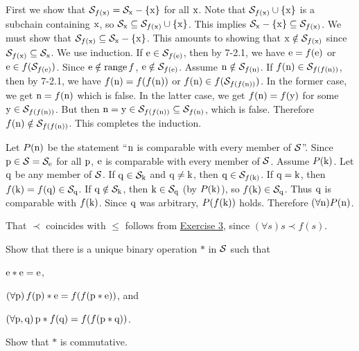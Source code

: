 \begin{solution}
First we show that $\mathcal{S}_{f(\mathrm{x})} = \mathcal{S}_{\mathrm{x}} - \left\{\mathrm{x}\right\}$ for all $\mathrm{x}$.
Note that $\mathcal{S}_{f(\mathrm{x})}\cup\left\{\mathrm{x}\right\}$ is a subchain containing $\mathrm{x}$, so
$\mathcal{S}_{\mathrm{x}}\subseteq \mathcal{S}_{f(\mathrm{x})}\cup\left\{\mathrm{x}\right\}$.
This implies $\mathcal{S}_{\mathrm{x}}-\left\{\mathrm{x}\right\}\subseteq \mathcal{S}_{f(\mathrm{x})}$.
We must show that $\mathcal{S}_{f(\mathrm{x})}\subseteq \mathcal{S}_{\mathrm{x}}-\left\{\mathrm{x}\right\}$. This amounts to showing
that $\mathrm{x}\notin \mathcal{S}_{f(\mathrm{x})}$ since $\mathcal{S}_{f(\mathrm{x})}\subseteq \mathcal{S}_{\mathrm{x}}$.
We use induction.
If $\mathrm{e}\in \mathcal{S}_{f(\mathrm{e})}$, then by 7-2.1, we have $\mathrm{e} = f(\mathrm{e})$ or
$\mathrm{e}\in f(\mathcal{S}_{f(\mathrm{e})})$. Since $\mathrm{e}\notin\operatorname{range} f$, $\mathrm{e}\notin \mathcal{S}_{f(\mathrm{e})}$.
Assume $\mathrm{n}\notin \mathcal{S}_{f(\mathrm{n})}$.
If $f(\mathrm{n})\in \mathcal{S}_{f(f(\mathrm{n}))}$, then by 7-2.1, we have $f(\mathrm{n})=f(f(\mathrm{n}))$
or $f(\mathrm{n})\in f(\mathcal{S}_{f(f(\mathrm{n}))})$. In the former case, we get $\mathrm{n}=f(\mathrm{n})$ which is false.
In the latter case, we get $f(\mathrm{n})=f(\mathrm{y})$ for some $\mathrm{y}\in \mathcal{S}_{f(f(\mathrm{n}))}$.
But then $\mathrm{n}=\mathrm{y}\in \mathcal{S}_{f(f(\mathrm{n}))}\subseteq \mathcal{S}_{f(\mathrm{n})}$, which is false.
Therefore $f(\mathrm{n})\notin \mathcal{S}_{f(f(\mathrm{n}))}$. This completes the induction.

Let $P(\mathrm{n})$ be the statement ``$\mathrm{n}$ is comparable with every member of $\mathcal{S}$''.
Since $\mathrm{p}\in \mathcal{S}=\mathcal{S}_{\mathrm{e}}$ for all $\mathrm{p}$, $\mathrm{e}$ is comparable with every member
of $\mathcal{S}$. Assume $P(\mathrm{k})$. Let $\mathrm{q}$ be any member of $\mathcal{S}$.
If $\mathrm{q}\in\mathcal{S}_{\mathrm{k}}$ and $\mathrm{q}\neq \mathrm{k}$, then $\mathrm{q}\in \mathcal{S}_{f(\mathrm{k})}$.
If $\mathrm{q}=\mathrm{k}$, then $f(\mathrm{k})=f(\mathrm{q})\in \mathcal{S}_{\mathrm{q}}$. If $\mathrm{q}\notin\mathcal{S}_{\mathrm{k}}$,
then $\mathrm{k}\in \mathcal{S}_{\mathrm{q}}$ (by $P(\mathrm{k})$), so $f(\mathrm{k})\in \mathcal{S}_{\mathrm{q}}$.
Thus $\mathrm{q}$ is comparable with $f(\mathrm{k})$.
Since $\mathrm{q}$ was arbitrary, $P(f(\mathrm{k}))$ holds.
Therefore $(\forall \mathrm{n})P(\mathrm{n})$.

That $\prec$ coincides with $\leq$ follows from \hyperref[ex:9-1.3]{Exercise 3},
since $(\forall s) s \prec f(s)$.
\end{solution}

\begin{exercise}
Show that there is a unique binary operation $\ast$ in $\mathcal{S}$ such that
\begin{enumalpha}
    \item $\mathrm{e} \ast \mathrm{e} = \mathrm{e}$,
    \item $(\forall \mathrm{p})\thinspace f(\mathrm{p})\ast \mathrm{e} = f(f(\mathrm{p} \ast \mathrm{e}))$, and
    \item $(\forall \mathrm{p}, \mathrm{q})\thinspace \mathrm{p}\ast f(\mathrm{q})=f(f(\mathrm{p}\ast\mathrm{q}))$.
\end{enumalpha}
Show that $\ast$ is commutative.
\end{exercise}

